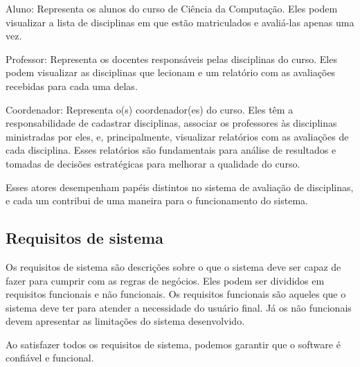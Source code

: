 \begin{alineas}
  \item Aluno: Representa os alunos do curso de Ciência da Computação. Eles podem visualizar a lista de disciplinas em que estão matriculados e avaliá-las apenas uma vez.
  \item Professor: Representa os docentes responsáveis pelas disciplinas do curso. Eles podem visualizar as disciplinas que lecionam e um relatório com as avaliações recebidas para cada uma delas.
  \item Coordenador: Representa o(s) coordenador(es) do curso. Eles têm a responsabilidade de cadastrar disciplinas, associar os professores às disciplinas ministradas por eles, e, principalmente, visualizar relatórios com as avaliações de cada disciplina. Esses relatórios são fundamentais para análise de resultados e tomadas de decisões estratégicas para melhorar a qualidade do curso.
\end{alineas}

Esses atores desempenham papéis distintos no sistema de avaliação de disciplinas, e cada um contribui de uma maneira para o funcionamento do sistema.


\subsection{Requisitos de sistema}
Os requisitos de sistema são descrições sobre o que o sistema deve ser capaz de fazer para cumprir com as regras de negócios. Eles podem ser divididos em requisitos funcionais e não funcionais. Os requisitos funcionais são aqueles que o sistema deve ter para atender a necessidade do usuário final. Já os não funcionais devem apresentar as limitações do sistema desenvolvido.

Ao satisfazer todos os requisitos de sistema, podemos garantir que o software é confiável e funcional. 

